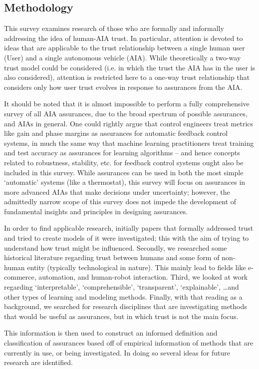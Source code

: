 \subsection{Methodology} \label{sec:methodology}
    This survey examines research of those who are formally and informally addressing the idea of human-AIA trust. In particular, attention is devoted to ideas that are applicable to the trust relationship between a single human user (User) and a single autonomous vehicle (AIA). While theoretically a two-way trust model could be considered (i.e. in which the trust the AIA has in the user is also considered), attention is restricted here to a one-way trust relationship that considers only how user trust evolves in response to assurances from the AIA. 

    It should be noted that it is almost impossible to perform a fully comprehensive survey of all AIA assurances, due to the broad spectrum of possible assurances, and AIAs in general. One could rightly argue that control engineers treat metrics like gain and phase margins as assurances for automatic feedback control systems, in much the same way that  machine learning practitioners treat training and test accuracy as assurances for learning algorithms -- and hence concepts related to robustness, stability, etc. for feedback control systems ought also be included in this survey. While assurances can be used in both the most simple `automatic' systems (like a thermostat), this survey will focus on assurances in more advanced AIAs that make decisions under uncertainty; however, the admittedly narrow scope of this survey does not impede the development of fundamental insights and principles in designing assurances.

    In order to find applicable research, initially papers that formally addressed trust and tried to create models of it were investigated; this with the aim of trying to understand how trust might be influenced. Secondly, we researched some historical literature regarding trust between humans and some form of non-human entity (typically technological in nature). This mainly lead to fields like e-commerce, automation, and human-robot interaction. Third, we looked at work regarding `interpretable', `comprehensible', `transparent', `explainable', \ldots and other types of learning and modeling methods. Finally, with that reading as a background, we searched for research disciplines that are investigating methods that would be useful as assurances, but in which trust is not the main focus.

    This information is then used to construct an informed definition and classification of assurances based off of empirical information of methods that are currently in use, or being investigated. In doing so several ideas for future research are identified.
